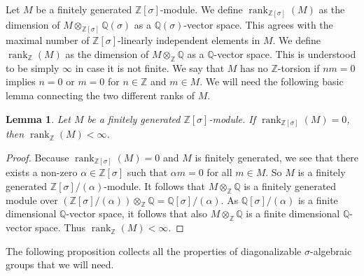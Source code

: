 \documentclass[oneside,reqno]{amsart}
\newtheorem{lemma}[theo]{Lemma}
\theoremstyle{definition}
\newcommand{\s}{\sigma}
\newcommand{\ZZ}{\mathbb{Z}}
\newcommand{\rank}{\operatorname{rank}}
\begin{document}
Let $M$ be a finitely generated $\ZZ[\s]$-module. We define $\rank_{\ZZ[\s]}(M)$ as the dimension of $M\otimes_{\ZZ[\s]}\mathbb{Q}(\s)$ as a $\mathbb{Q}(\s)$-vector space. This agrees with the maximal number of $\ZZ[\s]$-linearly independent elements in $M$. We define $\rank_\ZZ(M)$ as the dimension of $M\otimes_\ZZ\mathbb{Q}$ as a $\mathbb{Q}$-vector space. This is understood to be simply $\infty$ in case it is not finite. We say that $M$ has no $\ZZ$-torsion if $nm=0$ implies $n=0$ or $m=0$ for $n\in\ZZ$ and $m\in M$. We will need the following basic lemma connecting the two different ranks of $M$.


\begin{lemma} \label{lemma: ranks}
	Let $M$ be a finitely generated $\ZZ[\s]$-module. If $\rank_{\ZZ[\s]}(M)=0$, then $\rank_{\ZZ}(M)<\infty$.
\end{lemma}	
\begin{proof}
	Because $\rank_{\ZZ[\s]}(M)=0$ and $M$ is finitely generated, we see that there exists a non-zero $\alpha\in\ZZ[\s]$ such that $\alpha m=0$ for all $m\in M$. So $M$ is a finitely generated $\ZZ[\s]/(\alpha)$-module. It follows that $M\otimes_\ZZ\mathbb{Q}$ is a finitely generated module over $(\ZZ[\s]/(\alpha))\otimes_\ZZ\mathbb{Q}=\mathbb{Q}[\s]/(\alpha)$. As $\mathbb{Q}[\s]/(\alpha)$ is a finite dimensional $\mathbb{Q}$-vector space, it follows that also $M\otimes_\ZZ\mathbb{Q}$ is a finite dimensional $\mathbb{Q}$-vector space. Thus $\rank_{\ZZ}(M)<\infty$.
\end{proof}	 

The following proposition collects all the properties of diagonalizable $\s$-algebraic groups that we will need.
\end{document}
